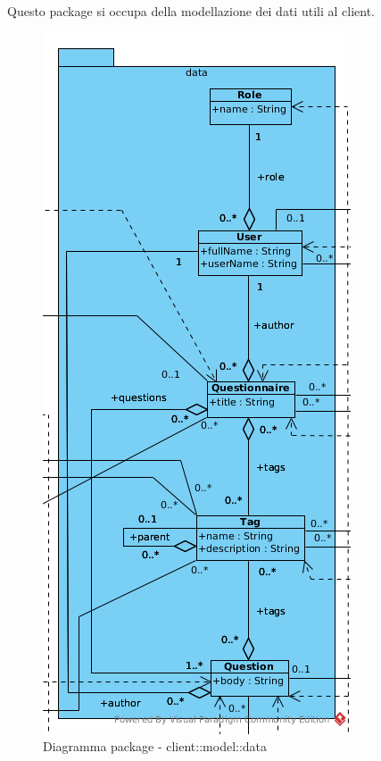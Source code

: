 Questo package si occupa della modellazione dei dati utili al client.\begin{center}
		\begin{figure}[H]
			\centering \includegraphics[scale=4, max width=\textwidth, max height=\myheight]{../img/diagrammiClassi/client/model/data.png}
			\caption{Diagramma package - client::model::data}
		\end{figure}
	\end{center}\hypertarget{client::model::data::Questionnaire}{}
